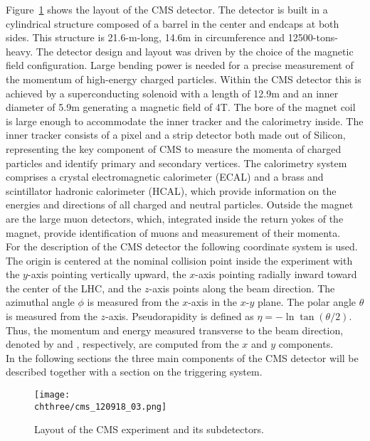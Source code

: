 Figure~\ref{fig:CMSlayout} shows the layout of the CMS detector. The detector is built in a cylindrical structure composed of a barrel in the center and endcaps at both sides. This structure is 21.6-m-long, 14.6\unit{m} in circumference and 12500-tons-heavy. The detector design and layout was driven by the choice of the magnetic field configuration. Large bending power is needed for a precise measurement of the momentum of high-energy charged particles. Within the CMS detector this is achieved by a superconducting solenoid with a length of 12.9\unit{m} and an inner diameter of 5.9\unit{m} generating a magnetic field of 4\unit{T}. The bore of the magnet coil is large enough to accommodate the inner tracker and the calorimetry inside. 
The inner tracker consists of a pixel and a strip detector both made out of Silicon, representing the key component of CMS to measure the momenta of charged particles and identify primary and secondary vertices. The calorimetry system comprises a crystal electromagnetic calorimeter (ECAL) and a brass and scintillator hadronic calorimeter (HCAL), which provide information on the energies and directions of all charged and neutral particles. Outside the magnet are the large muon detectors, which, integrated inside the return yokes of the magnet, provide identification of muons and measurement of their momenta.\\

For the description of the CMS detector the following coordinate system is used. The origin is centered at the nominal collision point inside the experiment with the $y$-axis pointing vertically upward, the $x$-axis pointing radially inward toward the center of the LHC, and the $z$-axis points along the beam direction. The azimuthal angle $\phi$ is measured from the $x$-axis in the $x$-$y$ plane. The polar angle $\theta$ is measured from the $z$-axis. Pseudorapidity is defined as $\eta = -\ln\tan(\theta/2)$. Thus, the momentum and energy measured transverse to the beam direction, denoted by \PT and \ET, respectively, are computed from the $x$ and $y$ components.\\

In the following sections the three main components of the CMS detector will be described together with a section on the triggering system.

\begin{figure}[!htb]
 \begin{center}
  \texttt{[image: \\chthree/cms\_120918\_03.png]}
 \end{center}
 \caption{Layout of the CMS experiment and its subdetectors.}
 \label{fig:CMSlayout}
\end{figure}

